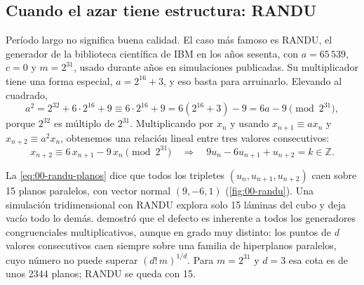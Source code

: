 \subsection{Cuando el azar tiene estructura: RANDU}

Período largo no significa buena calidad. El caso más famoso es RANDU, el generador de la biblioteca científica de IBM en los años sesenta, con $a=65\,539$, $c=0$ y $m=2^{31}$, usado durante años en simulaciones publicadas. Su multiplicador tiene una forma especial, $a = 2^{16}+3$, y eso basta para arruinarlo. Elevando al cuadrado,
\begin{equation}\label{eq:00-randu}
a^2 = 2^{32} + 6\cdot 2^{16} + 9 \equiv 6\cdot2^{16} + 9 = 6\left(2^{16}+3\right) - 9 = 6a - 9 \pmod{2^{31}},
\end{equation}
porque $2^{32}$ es múltiplo de $2^{31}$. Multiplicando por $x_n$ y usando $x_{n+1}\equiv a x_n$ y $x_{n+2}\equiv a^2 x_n$, obtenemos una relación lineal entre tres valores consecutivos:
\begin{equation}\label{eq:00-randu-planos}
x_{n+2} \equiv 6\,x_{n+1} - 9\,x_n \pmod{2^{31}} \quad\Longrightarrow\quad 9u_n - 6u_{n+1} + u_{n+2} = k\in\mathbb{Z}.
\end{equation}

\begin{simbolos}
\simbolo{$u_n$}{Salida normalizada $x_n/2^{31}\in[0,1)$.}
\end{simbolos}

La \cref{eq:00-randu-planos} dice que todos los tripletes $(u_n,u_{n+1},u_{n+2})$ caen sobre 15 planos paralelos, con vector normal $(9,-6,1)$ (\cref{fig:00-randu}). Una simulación tridimensional con RANDU explora solo 15 láminas del cubo y deja vacío todo lo demás. \textcite{c00-marsaglia1968} demostró que el defecto es inherente a todos los generadores congruenciales multiplicativos, aunque en grado muy distinto: los puntos de $d$ valores consecutivos caen siempre sobre una familia de hiperplanos paralelos, cuyo número no puede superar $(d!\,m)^{1/d}$. Para $m=2^{31}$ y $d=3$ esa cota es de unos \num{2344} planos; RANDU se queda con 15.

